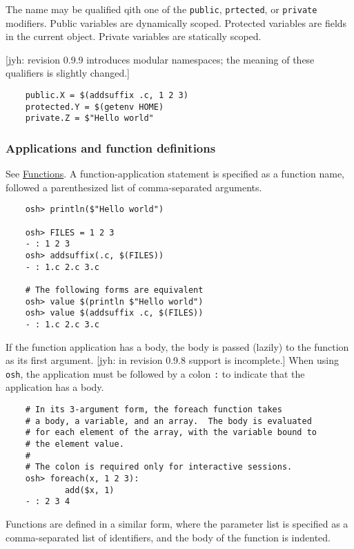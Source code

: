 The name may be qualified qith one of the \verb+public+, \verb+prtected+, or \verb+private+
modifiers.  Public variables are dynamically scoped.  Protected variables are fields in the current
object.  Private variables are statically scoped.

[jyh: revision 0.9.9 introduces modular namespaces; the meaning of these qualifiers is slightly changed.]

\begin{verbatim}
    public.X = $(addsuffix .c, 1 2 3)
    protected.Y = $(getenv HOME)
    private.Z = $"Hello world"
\end{verbatim}

\subsubsection{Applications and function definitions}

See \href{omake-language.html#functions}{Functions}.  A function-application statement is specified as a
function name, followed a parenthesized list of comma-separated arguments.

\begin{verbatim}
    osh> println($"Hello world")

    osh> FILES = 1 2 3
    - : 1 2 3
    osh> addsuffix(.c, $(FILES))
    - : 1.c 2.c 3.c

    # The following forms are equivalent
    osh> value $(println $"Hello world")
    osh> value $(addsuffix .c, $(FILES))
    - : 1.c 2.c 3.c
\end{verbatim}

If the function application has a body, the body is passed (lazily) to the function as its first
argument.  [jyh: in revision 0.9.8 support is incomplete.]  When using \verb+osh+, the application
must be followed by a colon \verb+:+ to indicate that the application has a body.

\begin{verbatim}
    # In its 3-argument form, the foreach function takes
    # a body, a variable, and an array.  The body is evaluated
    # for each element of the array, with the variable bound to
    # the element value.
    #
    # The colon is required only for interactive sessions.
    osh> foreach(x, 1 2 3):
            add($x, 1)
    - : 2 3 4
\end{verbatim}

Functions are defined in a similar form, where the parameter list is specified as a comma-separated
list of identifiers, and the body of the function is indented.

